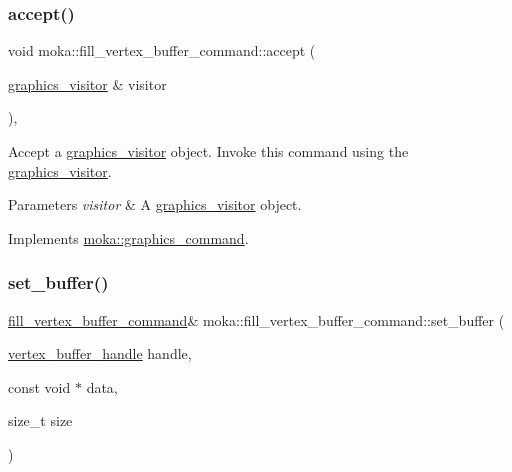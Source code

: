 \subsubsection{\texorpdfstring{accept()}{accept()}}
{\footnotesize\ttfamily void moka\+::fill\+\_\+vertex\+\_\+buffer\+\_\+command\+::accept (\begin{DoxyParamCaption}\item[{\mbox{\hyperlink{classmoka_1_1graphics__visitor}{graphics\+\_\+visitor}} \&}]{visitor }\end{DoxyParamCaption})\hspace{0.3cm}{\ttfamily [override]}, {\ttfamily [virtual]}}



Accept a \mbox{\hyperlink{classmoka_1_1graphics__visitor}{graphics\+\_\+visitor}} object. Invoke this command using the \mbox{\hyperlink{classmoka_1_1graphics__visitor}{graphics\+\_\+visitor}}. 


\begin{DoxyParams}{Parameters}
{\em visitor} & A \mbox{\hyperlink{classmoka_1_1graphics__visitor}{graphics\+\_\+visitor}} object. \\
\hline
\end{DoxyParams}


Implements \mbox{\hyperlink{classmoka_1_1graphics__command_a7affaeceb1019ab358c62185bce4e654}{moka\+::graphics\+\_\+command}}.

\mbox{\label{classmoka_1_1fill__vertex__buffer__command_ace6582db2bd3043670696ea887fd31a6}} 
\subsubsection{\texorpdfstring{set\_buffer()}{set\_buffer()}}
{\footnotesize\ttfamily \mbox{\hyperlink{classmoka_1_1fill__vertex__buffer__command}{fill\+\_\+vertex\+\_\+buffer\+\_\+command}}\& moka\+::fill\+\_\+vertex\+\_\+buffer\+\_\+command\+::set\+\_\+buffer (\begin{DoxyParamCaption}\item[{\mbox{\hyperlink{structmoka_1_1vertex__buffer__handle}{vertex\+\_\+buffer\+\_\+handle}}}]{handle,  }\item[{const void $\ast$}]{data,  }\item[{size\+\_\+t}]{size }\end{DoxyParamCaption})}



